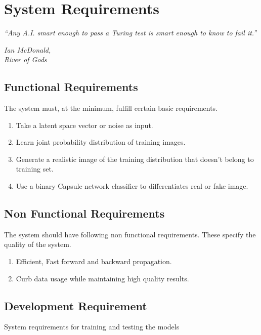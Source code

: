 \chapter{System Requirements}\label{ch:system_requirements}
\epigraph{\textit{\normalsize “Any A.I. smart enough to pass a Turing test is smart enough to know to fail it.”}}{\textit{ \normalsize Ian McDonald,\\ River of Gods}}

\section{Functional Requirements} %
\label{sec:functional_requirements}
The system must, at the minimum, fulfill certain basic requirements.
\begin{enumerate}
    \item Take a latent space vector or noise as input.
    \item Learn joint probability distribution of training images.
    \item Generate a realistic image of the training distribution that doesn't belong to training set.
    \item Use a binary Capsule network classifier to differentiates real or fake image.
\end{enumerate}
\section{Non Functional Requirements} %
\label{sec:non_functional_requirements}
The system should have following non functional requirements. These specify the quality of the system.
\begin{enumerate}
    \item Efficient, Fast forward and backward propagation.
    \item Curb data usage while maintaining high quality results.    
\end{enumerate}

\section{Development Requirement} %
\label{sec:development_requirement}
System requirements for training and testing the models
